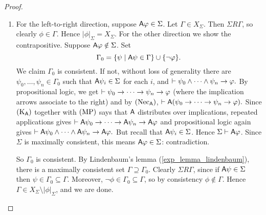\begin{proof}\leavevmode
\begin{enumerate}
      \item For the left-to-right direction, suppose $\mathsf{A}\varphi \in \Sigma$. Let
      $\Gamma \in X_\Sigma$. Then $\Sigma R \Gamma$, so clearly $\phi
      \in \Gamma$. Hence $|\phi|_\Sigma = X_\Sigma$.
      For the other direction we show the contrapositive. Suppose
      $\mathsf{A}\varphi \notin \Sigma$. Set
      \[
        \Gamma_0 = \{\psi \mid \mathsf{A}\psi \in \Gamma\} \cup \{\neg\varphi\}.
      \]
      We claim $\Gamma_0$ is consistent. If not, without loss of
      generality there are $\psi_0, \ldots, \psi_n \in \Gamma_0$ such
      that $\mathsf{A}\psi_i \in \Sigma$ for each $i$, and
      $
        \vdash \psi_0 \land \cdots \land \psi_n \to \varphi.
      $
      By propositional logic, we get
      $
          \vdash \psi_0 \to \cdots \to \psi_n \to
          \varphi
      $
      (where the implication arrows associate to the right) and by
      $(\text{Nec}_{\mathsf{A}})$,
      $
          \vdash \mathsf{A}(\psi_0 \to \cdots \to \psi_n \to
          \varphi).
      $
      Since $(\text{K}_{\mathsf{A}})$ together with $(\text{MP})$ says that $\mathsf{A}$ distributes
      over implications, repeated applications gives
      $
        \vdash \mathsf{A}\psi_0 \to \cdots \to \mathsf{A}\psi_n \to
        \mathsf{A}\varphi
      $
      and propositional logic again gives
      $
          \vdash \mathsf{A}\psi_0 \land \cdots \land \mathsf{A}\psi_n \to \mathsf{A}\varphi.
      $
      But recall that $\mathsf{A}\psi_i \in \Sigma$. Hence $\Sigma \vdash
      \mathsf{A}\varphi$. Since $\Sigma$ is maximally consistent, this means
      $\mathsf{A}\varphi \in \Sigma$: contradiction.

      So $\Gamma_0$ is consistent. By Lindenbaum's lemma
      (\cref{exp_lemma_lindenbaum}), there is a maximally consistent set
      $\Gamma \supseteq \Gamma_0$. Clearly $\Sigma R \Gamma$, since if
      $\mathsf{A}\psi \in \Sigma$ then $\psi \in \Gamma_0 \subseteq \Gamma$.
      Moreover, $\neg\phi \in \Gamma_0 \subseteq \Gamma$, so by
      consistency $\phi \notin \Gamma$. Hence $\Gamma \in X_\Sigma
      \setminus |\phi|_\Sigma$, and we are done.


\end{enumerate}
\end{proof}
